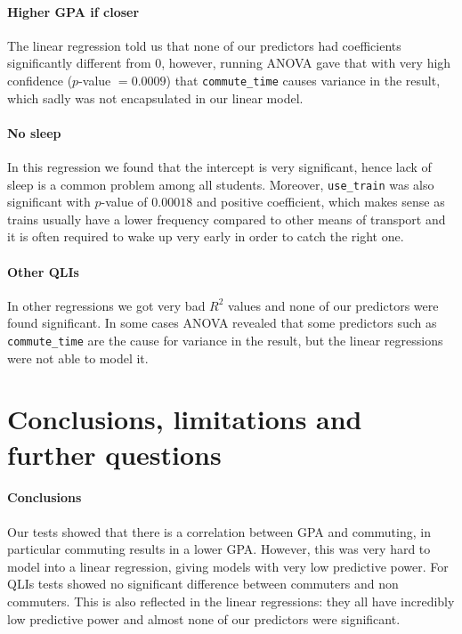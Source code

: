 \documentclass[11pt]{extarticle}
\numberwithin{table}{section}
\numberwithin{figure}{section}
\numberwithin{equation}{section}
\begin{document}
\paragraph{Higher GPA if closer}
The linear regression told us that none of our predictors had coefficients
significantly different from $0$, however, running ANOVA gave that with
very high confidence ($p$-value $= 0.0009$) that \texttt{commute\_time}
causes variance in the result, which sadly was not encapsulated in our linear model.

\paragraph{No sleep}
In this regression we found that the intercept is very significant,
hence lack of sleep is a common problem among all students.
Moreover, \texttt{use\_train} was also significant with $p$-value of $0.00018$
and positive coefficient, which makes sense as trains usually have a
lower frequency compared to other means of transport and it is often required
to wake up very early in order to catch the right one.

\paragraph{Other QLIs}
In other regressions we got very bad $R^2$ values and none of our predictors
were found significant.
In some cases ANOVA revealed that some predictors such as \texttt{commute\_time}
are the cause for variance in the result, but the linear regressions were not able
to model it.

\section{Conclusions, limitations and further questions}

\paragraph{Conclusions}
Our tests showed that there is a correlation between GPA and commuting,
in particular commuting results in a lower GPA.
However, this was very hard to model into a linear regression, giving models with very low
predictive power.
For QLIs tests showed no significant difference between commuters and non commuters.
This is also reflected in the linear regressions: they all have incredibly low predictive power
and almost none of our predictors were significant.
\end{document}
